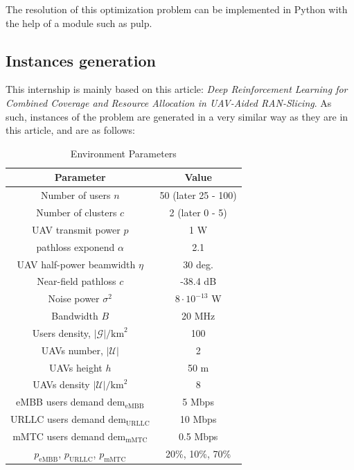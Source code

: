 \documentclass[letterpaper]{article}
\begin{document}
The resolution of this optimization problem can be implemented in Python with the help of a module such as pulp.

\subsection{Instances generation}

This internship is mainly based on this article: \textit{Deep Reinforcement Learning for Combined Coverage and Resource Allocation in UAV-Aided RAN-Slicing}\cite{main_article}.
As such, instances of the problem are generated in a very similar way as they are in this article, and are as follows:

\begin{table}[H]
    \centering
    \begin{tabular}{|c|c|}
    \hline
    Parameter & Value \\
    \hline
        Number of users $n$ & 50 (later 25 - 100)\\
        Number of clusters $c$ & 2 (later 0 - 5) \\
        UAV transmit power $p$ &  1 W\\
        pathloss exponend $\alpha$ & 2.1 \cite{Channel_Model}\\
        UAV half-power beamwidth $\eta$ & 30 deg. \cite{Channel_Model}\\
        Near-field pathloss $c$ & -38.4 dB \cite{Channel_Model}\\
        Noise power $\sigma^2$ & $8 \cdot 10^{-13}$ W\\
        Bandwidth $B$ & 20 MHz\\
        Users density, $|\mathcal{G}|/\text{km}^2$ & 100\\
        UAVs number, $|\mathcal{U}|$ & 2\\
        UAVs height $h$ & 50 m\\
        UAVs density $|\mathcal{U}|/\text{km}^2$ & 8\\
        eMBB users demand $\text{dem}_\text{eMBB}$ & 5 Mbps \cite{demandsvalues}\\
        URLLC users demand $\text{dem}_\text{URLLC}$ & 10 Mbps \cite{demandsvalues}\\
        mMTC users demand $\text{dem}_\text{mMTC}$ & 0.5 Mbps \cite{demandsvalues}\\
        $p_{\text{eMBB}}$, $p_{\text{URLLC}}$, $p_{\text{mMTC}}$ & 20\%, 10\%, 70\% \\
    \hline
    \end{tabular}
    \caption{Environment Parameters}
    \label{tab:envparams}
\end{table}
\end{document}

